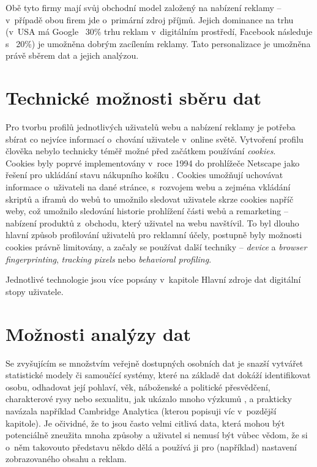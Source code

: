 Obě tyto firmy mají svůj obchodní model založený na nabízení reklamy -- v~případě obou firem jde o~primární zdroj příjmů. Jejich dominance na trhu (v~USA má Google ~30\% trhu reklam\citep{google-ads} v~digitálním prostředí, Facebook následuje s ~20\%) je umožněna dobrým zacílením reklamy. Tato personalizace je umožněna právě sběrem dat a jejich analýzou.



\section{Technické možnosti sběru dat}

Pro tvorbu profilů jednotlivých uživatelů webu a nabízení reklamy je potřeba sbírat co nejvíce informací o~chování uživatele v~online světě. Vytvoření profilu člověka nebylo technicky téměř možné před začátkem používání \textit{cookies}.\\
Cookies byly poprvé implementovány v~roce 1994 do prohlížeče Netscape jako řešení pro ukládání stavu nákupního košíku \citep{cookies-history}. Cookies umožňují uchovávat informace o~uživateli na dané stránce, s~rozvojem webu a zejména vkládání skriptů a iframů do webů to umožnilo sledovat uživatele skrze cookies napříč weby, což umožnilo sledování historie prohlížení části webů a remarketing -- nabízení produktů z~obchodu, který uživatel na webu navštívil\citep{scott-cookies}. To byl dlouho hlavní způsob profilování uživatelů pro reklamní účely, postupně byly možnosti cookies právně limitovány, a začaly se používat další techniky -- \textit{device} a \textit{browser fingerprinting}, \textit{tracking pixels} nebo \textit{behavioral profiling}.

Jednotlivé technologie jsou více popsány v~kapitole Hlavní zdroje dat digitální stopy uživatele.

\section{Možnosti analýzy dat}
Se zvyšujícím se množstvím veřejně dostupných osobních dat je snazší vytvářet statistické modely či samoučící systémy, které na základě dat dokáží identifikovat osobu, odhadovat její pohlaví, věk, náboženské a politické přesvědčení, charakterové rysy nebo sexualitu, jak ukázalo mnoho výzkumů \citep{big-5-predictions}, a prakticky navázala například Cambridge Analytica (kterou popisuji víc v~pozdější kapitole). Je očividné, že to jsou často velmi citlivá data, která mohou být potenciálně zneužita mnoha způsoby a uživatel si nemusí být vůbec vědom, že si o~něm takovouto představu někdo dělá a používá ji pro (například) nastavení zobrazovaného obsahu a reklam. 

